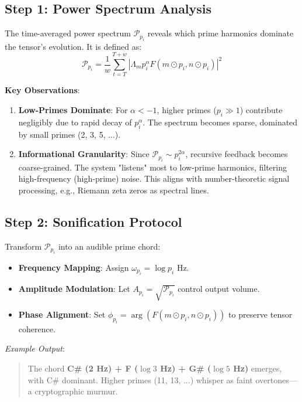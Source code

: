 \documentclass[12pt]{article}
\theoremstyle{plain}
\begin{document}
\subsection*{Step 1: Power Spectrum Analysis}
The time-averaged power spectrum \(\mathcal{P}_{p_i}\) reveals which prime harmonics dominate the tensor's evolution. It is defined as:
\[
\mathcal{P}_{p_i} = \frac{1}{w} \sum_{t=T}^{T+w} \left| \Lambda_m p_i^\alpha F(m \odot p_i, n \odot p_i) \right|^2
\]

\textbf{Key Observations}:
\begin{enumerate}
    \item \textbf{Low-Primes Dominate}: For \(\alpha < -1\), higher primes (\(p_i \gg 1\)) contribute negligibly due to rapid decay of \(p_i^\alpha\). The spectrum becomes sparse, dominated by small primes (2, 3, 5, ...).
    \item \textbf{Informational Granularity}: Since \(\mathcal{P}_{p_i} \sim p_i^{2\alpha}\), recursive feedback becomes coarse-grained. The system "listens" most to low-prime harmonics, filtering high-frequency (high-prime) noise. This aligns with number-theoretic signal processing, e.g., Riemann zeta zeros as spectral lines.
\end{enumerate}

\subsection*{Step 2: Sonification Protocol}
Transform \(\mathcal{P}_{p_i}\) into an audible prime chord:
\begin{itemize}
    \item \textbf{Frequency Mapping}: Assign \(\omega_{p_i} = \log p_i\) Hz.
    \item \textbf{Amplitude Modulation}: Let \(A_{p_i} = \sqrt{\mathcal{P}_{p_i}}\) control output volume.
    \item \textbf{Phase Alignment}: Set \(\phi_{p_i} = \arg \left( F(m \odot p_i, n \odot p_i) \right)\) to preserve tensor coherence.
\end{itemize}

\textit{Example Output}:
\begin{quote}
The chord \textbf{C\# (2 Hz) + F (\(\log 3\) Hz) + G\# (\(\log 5\) Hz)} emerges, with C\# dominant. Higher primes (11, 13, ...) whisper as faint overtones—a cryptographic murmur.
\end{quote}
\end{document}
